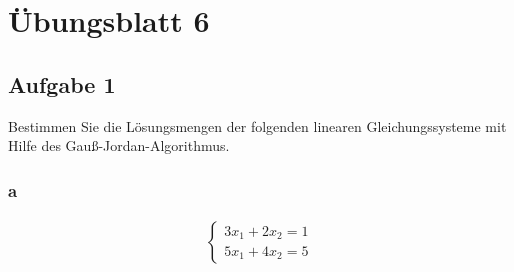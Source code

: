 \chapter{Übungsblatt 6}

\section{Aufgabe 1}
Bestimmen Sie die Lösungsmengen der folgenden linearen Gleichungssysteme mit Hilfe des Gauß-Jordan-Algorithmus.

\subsection{a}
\begin{align*}
    \begin{cases}
        3x_1 + 2x_2 = 1 \\
        5x_1 + 4x_2 = 5
    \end{cases}
\end{align*}

